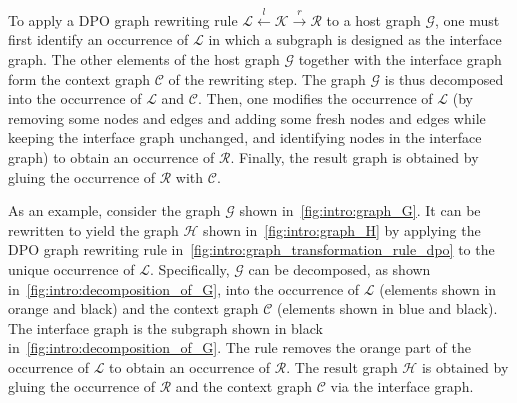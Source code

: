 To apply a DPO graph rewriting rule $\mathcal{L} \overset{l}{\leftarrow} \mathcal{K} \overset{r}{\rightarrow} \mathcal{R}$ to a host graph $\mathcal{G}$, one must first identify an occurrence of $\mathcal{L}$ in which a subgraph is designed as the interface graph. The other elements of the host graph $\mathcal{G}$ together with the interface graph form the context graph $\mathcal{C}$ of the rewriting step.
The graph $\mathcal{G}$ is thus decomposed into the occurrence of $\mathcal{L}$ and $\mathcal{C}$. 
Then, one modifies the occurrence of $\mathcal{L}$ (by removing some nodes and edges and adding some fresh nodes and edges while keeping the interface graph unchanged, and identifying nodes in the interface graph)
to obtain an occurrence of $\mathcal{R}$. Finally, the result graph is obtained by gluing the occurrence of $\mathcal{R}$ with $\mathcal{C}$.


As an example, consider the graph $\mathcal{G}$ shown in~\autoref{fig:intro:graph_G}. 
It can be rewritten to yield the graph $\mathcal{H}$ shown in~\autoref{fig:intro:graph_H} by applying the DPO graph rewriting rule in~\autoref{fig:intro:graph_transformation_rule_dpo} to the unique occurrence of $\mathcal{L}$.
Specifically, $\mathcal{G}$ can be decomposed, as shown in~\autoref{fig:intro:decomposition_of_G}, into the occurrence of $\mathcal{L}$ (elements shown in orange and black) and the context graph $\mathcal{C}$ (elements shown in blue and black). The interface graph is the subgraph shown in black in~\autoref{fig:intro:decomposition_of_G}. The rule removes the orange part of the occurrence of $\mathcal{L}$ to obtain an occurrence of $\mathcal{R}$. 
The result graph $\mathcal{H}$ is obtained by gluing the occurrence of $\mathcal{R}$ and the context graph $\mathcal{C}$ via the interface graph.
  
